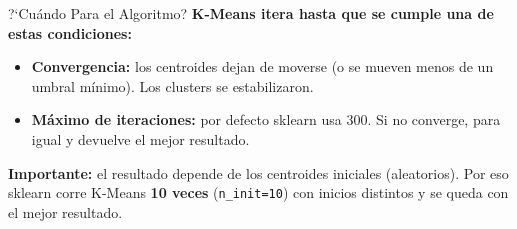 \documentclass[aspectratio=169, 11pt]{beamer}
\begin{document}
\begin{frame}{?`Cu\'ando Para el Algoritmo?}
  \vspace{-4pt}
  {\footnotesize\color{arcaDark}\bfseries
    K-Means itera hasta que se cumple una de estas condiciones:}

  \vspace{6pt}
  {\footnotesize
  \begin{itemize}\setlength{\itemsep}{5pt}
    \item[{\color{codeGreen}\scriptsize\faCheckCircle}]
      \textbf{Convergencia:} los centroides dejan de moverse
      (o se mueven menos de un umbral m\'inimo). Los clusters
      se estabilizaron.
    \item[{\color{arcaRed}\scriptsize\faCheckCircle}]
      \textbf{M\'aximo de iteraciones:} por defecto sklearn usa 300.
      Si no converge, para igual y devuelve el mejor resultado.
  \end{itemize}
  }

  \vspace{6pt}
  \begin{tcolorbox}[colback=arcaGray, colframe=arcaRed, boxrule=0.5pt, arc=2pt,
    left=6pt, right=6pt, top=4pt, bottom=4pt]
    {\scriptsize\color{arcaDark}
    \faExclamationTriangle\hspace{4pt}\textbf{Importante:} el resultado
    depende de los centroides iniciales (aleatorios). Por eso sklearn
    corre K-Means \textbf{10 veces} (\texttt{n\_init=10}) con inicios
    distintos y se queda con el mejor resultado.}
  \end{tcolorbox}
\end{frame}
\end{document}
